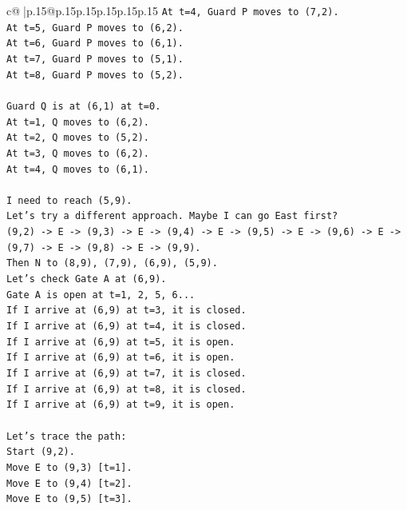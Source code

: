 \documentclass{article}
\begin{document}
{\begin{supertabular}{c@{$\;$}|p{.15\linewidth}@{}p{.15\linewidth}p{.15\linewidth}p{.15\linewidth}p{.15\linewidth}p{.15\linewidth}}
{{{\texttt{At t=4, Guard P moves to (7,2).} \\
\texttt{At t=5, Guard P moves to (6,2).} \\
\texttt{At t=6, Guard P moves to (6,1).} \\
\texttt{At t=7, Guard P moves to (5,1).} \\
\texttt{At t=8, Guard P moves to (5,2).} \\
\\ 
\texttt{Guard Q is at (6,1) at t=0.} \\
\texttt{At t=1, Q moves to (6,2).} \\
\texttt{At t=2, Q moves to (5,2).} \\
\texttt{At t=3, Q moves to (6,2).} \\
\texttt{At t=4, Q moves to (6,1).} \\
\\ 
\texttt{I need to reach (5,9).} \\
\texttt{Let's try a different approach. Maybe I can go East first?} \\
\texttt{(9,2) {-}> E {-}> (9,3) {-}> E {-}> (9,4) {-}> E {-}> (9,5) {-}> E {-}> (9,6) {-}> E {-}> (9,7) {-}> E {-}> (9,8) {-}> E {-}> (9,9).} \\
\texttt{Then N to (8,9), (7,9), (6,9), (5,9).} \\
\texttt{Let's check Gate A at (6,9).} \\
\texttt{Gate A is open at t=1, 2, 5, 6...} \\
\texttt{If I arrive at (6,9) at t=3, it is closed.} \\
\texttt{If I arrive at (6,9) at t=4, it is closed.} \\
\texttt{If I arrive at (6,9) at t=5, it is open.} \\
\texttt{If I arrive at (6,9) at t=6, it is open.} \\
\texttt{If I arrive at (6,9) at t=7, it is closed.} \\
\texttt{If I arrive at (6,9) at t=8, it is closed.} \\
\texttt{If I arrive at (6,9) at t=9, it is open.} \\
\\ 
\texttt{Let's trace the path:} \\
\texttt{Start (9,2).} \\
\texttt{Move E to (9,3) {[}t=1{]}.} \\
\texttt{Move E to (9,4) {[}t=2{]}.} \\
\texttt{Move E to (9,5) {[}t=3{]}.} \\
}}}
\end{supertabular}}
\end{document}
